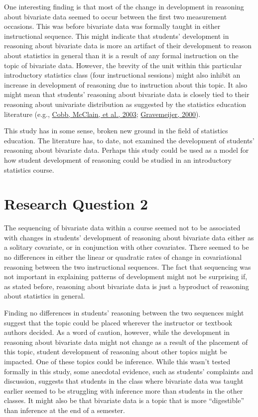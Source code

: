 \documentclass[11pt]{umnthesis}
\begin{document}
One interesting finding is that most of the change in development in reasoning about bivariate data seemed to occur between the first two measurement occasions. This was before bivariate data was formally taught in either instructional sequence. This might indicate that students' development in reasoning about bivariate data is more an artifact of their development to reason about statistics in general than it is a result of any formal instruction on the topic of bivariate data. However, the brevity of the unit within this particular introductory statistics class (four instructional sessions) might also inhibit an increase in development of reasoning due to instruction about this topic. It also might mean that students' reasoning about bivariate data is closely tied to their reasoning about univariate distribution as suggested by the statistics education literature (e.g., \protect\hyperlink{ref-cobb:2003a}{Cobb, McClain, et al., 2003}; \protect\hyperlink{ref-gravemeijer:2000}{Gravemeijer, 2000}).

This study has in some sense, broken new ground in the field of statistics education. The literature has, to date, not examined the development of students' reasoning about bivariate data. Perhaps this study could be used as a model for how student development of reasoning could be studied in an introductory statistics course.

\hypertarget{research-question-2}{%
\section{Research Question 2}\label{research-question-2}}

The sequencing of bivariate data within a course seemed not to be associated with changes in students' development of reasoning about bivariate data either as a solitary covariate, or in conjunction with other covariates. There seemed to be no differences in either the linear or quadratic rates of change in covariational reasoning between the two instructional sequences. The fact that sequencing was not important in explaining patterns of development might not be surprising if, as stated before, reasoning about bivariate data is just a byproduct of reasoning about statistics in general.

Finding no differences in students' reasoning between the two sequences might suggest that the topic could be placed wherever the instructor or textbook authors decided. As a word of caution, however, while the development in reasoning about bivariate data might not change as a result of the placement of this topic, student development of reasoning about other topics might be impacted. One of these topics could be inference. While this wasn't tested formally in this study, some anecdotal evidence, such as students' complaints and discussion, suggests that students in the class where bivariate data was taught earlier seemed to be struggling with inference more than students in the other classes. It might also be that bivariate data is a topic that is more ``digestible'' than inference at the end of a semester.
\end{document}
